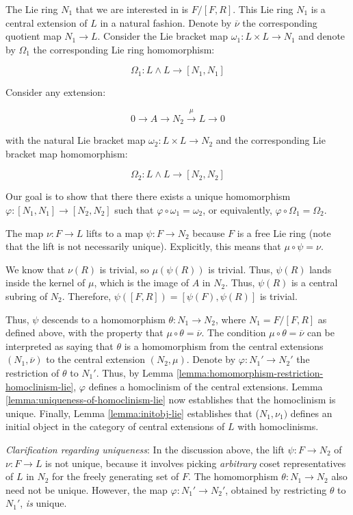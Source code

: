 \documentclass{ucetd}
\begin{document}
The Lie ring $N_1$ that we are interested in is $F/[F,R]$. This Lie ring
$N_1$ is a central extension of $L$ in a natural fashion. Denote by
$\overline{\nu}$ the corresponding quotient map $N_1 \to L$. Consider
the Lie bracket map $\omega_1:L \times L \to N_1$ and denote by
$\Omega_1$ the corresponding Lie ring homomorphism:

$$\Omega_1: L \wedge L \to [N_1,N_1]$$

Consider any extension:

$$0 \to A \to N_2 \stackrel{\mu}{\to} L \to 0$$

with the natural Lie bracket map $\omega_2:L \times L \to N_2$ and the
corresponding Lie bracket map homomorphism:

$$\Omega_2:L \wedge L \to [N_2,N_2]$$

Our goal is to show that there there exists a unique homomorphism
$\varphi:[N_1,N_1] \to [N_2,N_2]$ such that $\varphi \circ
\omega_1 = \omega_2$, or equivalently, $\varphi \circ \Omega_1 =
\Omega_2$.

The map $\nu:F \to L$ lifts to a map $\psi:F \to N_2$ because $F$
is a free Lie ring (note that the lift is not necessarily
unique). Explicitly, this means that $\mu \circ \psi = \nu$.

We know that $\nu(R)$ is trivial, so $\mu(\psi(R))$ is trivial. Thus,
$\psi(R)$ lands inside the kernel of $\mu$, which is the image of $A$
in $N_2$. Thus, $\psi(R)$ is a central subring of $N_2$. Therefore,
$\psi([F,R]) = [\psi(F),\psi(R)]$ is trivial.

Thus, $\psi$ descends to a homomorphism $\theta:N_1 \to N_2$, where
$N_1 = F/[F,R]$ as defined above, with the property that $\mu \circ
\theta = \overline{\nu}$. The condition $\mu \circ \theta =
\overline{\nu}$ can be interpreted as saying that $\theta$ is a
homomorphism from the central extensions $(N_1,\overline{\nu})$ to the
central extension $(N_2,\mu)$. Denote by $\varphi:N_1' \to N_2'$ the
restriction of $\theta$ to $N_1'$. Thus, by Lemma
\ref{lemma:homomorphism-restriction-homoclinism-lie}, $\varphi$
defines a homoclinism of the central extensions. Lemma
\ref{lemma:uniqueness-of-homoclinism-lie} now establishes that the
homoclinism is unique. Finally, Lemma \ref{lemma:initobj-lie}
establishes that ($N_1,\nu_1)$ defines an initial object in the
category of central extensions of $L$ with homoclinisms.

{\em Clarification regarding uniqueness}: In the discussion above, the
lift $\psi: F \to N_2$ of $\nu:F \to L$ is not unique, because it
involves picking {\em arbitrary} coset representatives of $L$ in $N_2$
for the freely generating set of $F$. The homomorphism $\theta:N_1 \to
N_2$ also need not be unique. However, the map $\varphi:N_1' \to
N_2'$, obtained by restricting $\theta$ to $N_1'$, {\em is} unique.
\end{document}
